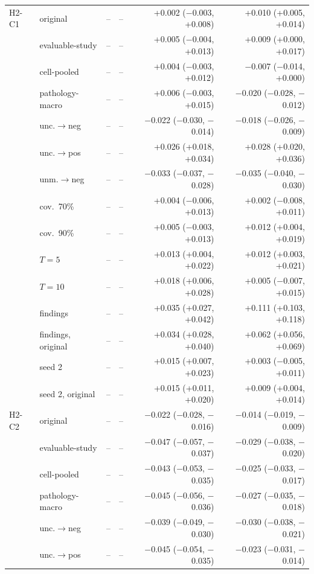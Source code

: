 \begin{longtable}{llrrrr}
\midrule
H2-C1 & original & -- & -- & +0.002 ($-$0.003, +0.008) & +0.010 (+0.005, +0.014)\\
 & evaluable-study & -- & -- & +0.005 ($-$0.004, +0.013) & +0.009 (+0.000, +0.017)\\
 & cell-pooled & -- & -- & +0.004 ($-$0.003, +0.012) & $-$0.007 ($-$0.014, +0.000)\\
 & pathology-macro & -- & -- & +0.006 ($-$0.003, +0.015) & $-$0.020 ($-$0.028, $-$0.012)\\
 & unc.$\to$neg & -- & -- & $-$0.022 ($-$0.030, $-$0.014) & $-$0.018 ($-$0.026, $-$0.009)\\
 & unc.$\to$pos & -- & -- & +0.026 (+0.018, +0.034) & +0.028 (+0.020, +0.036)\\
 & unm.$\to$neg & -- & -- & $-$0.033 ($-$0.037, $-$0.028) & $-$0.035 ($-$0.040, $-$0.030)\\
 & cov.\ 70\% & -- & -- & +0.004 ($-$0.006, +0.013) & +0.002 ($-$0.008, +0.011)\\
 & cov.\ 90\% & -- & -- & +0.005 ($-$0.003, +0.013) & +0.012 (+0.004, +0.019)\\
 & $T=5$ & -- & -- & +0.013 (+0.004, +0.022) & +0.012 (+0.003, +0.021)\\
 & $T=10$ & -- & -- & +0.018 (+0.006, +0.028) & +0.005 ($-$0.007, +0.015)\\
 & findings & -- & -- & +0.035 (+0.027, +0.042) & +0.111 (+0.103, +0.118)\\
 & findings, original & -- & -- & +0.034 (+0.028, +0.040) & +0.062 (+0.056, +0.069)\\
 & seed 2 & -- & -- & +0.015 (+0.007, +0.023) & +0.003 ($-$0.005, +0.011)\\
 & seed 2, original & -- & -- & +0.015 (+0.011, +0.020) & +0.009 (+0.004, +0.014)\\
\midrule
H2-C2 & original & -- & -- & $-$0.022 ($-$0.028, $-$0.016) & $-$0.014 ($-$0.019, $-$0.009)\\
 & evaluable-study & -- & -- & $-$0.047 ($-$0.057, $-$0.037) & $-$0.029 ($-$0.038, $-$0.020)\\
 & cell-pooled & -- & -- & $-$0.043 ($-$0.053, $-$0.035) & $-$0.025 ($-$0.033, $-$0.017)\\
 & pathology-macro & -- & -- & $-$0.045 ($-$0.056, $-$0.036) & $-$0.027 ($-$0.035, $-$0.018)\\
 & unc.$\to$neg & -- & -- & $-$0.039 ($-$0.049, $-$0.030) & $-$0.030 ($-$0.038, $-$0.021)\\
 & unc.$\to$pos & -- & -- & $-$0.045 ($-$0.054, $-$0.035) & $-$0.023 ($-$0.031, $-$0.014)\\

\end{longtable}
